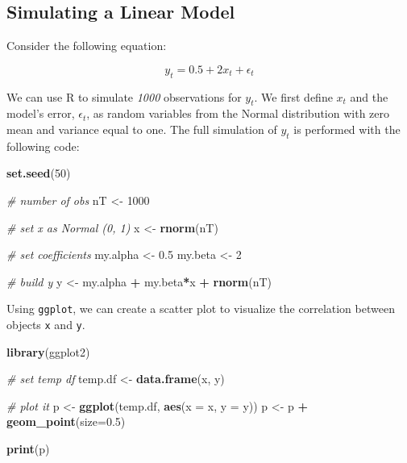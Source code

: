 \documentclass[11pt,]{book}
\newenvironment{Shaded}{\begin{snugshade}}{\end{snugshade}}
\newcommand{\KeywordTok}[1]{\textcolor[rgb]{0.27,0.27,0.27}{\textbf{#1}}}
\newcommand{\DataTypeTok}[1]{\textcolor[rgb]{0.27,0.27,0.27}{#1}}
\newcommand{\DecValTok}[1]{\textcolor[rgb]{0.06,0.06,0.06}{#1}}
\newcommand{\FloatTok}[1]{\textcolor[rgb]{0.06,0.06,0.06}{#1}}
\newcommand{\StringTok}[1]{\textcolor[rgb]{0.5,0.5,0.5}{#1}}
\newcommand{\CommentTok}[1]{\textcolor[rgb]{0.56,0.35,0.01}{\textit{#1}}}
\newcommand{\OperatorTok}[1]{\textcolor[rgb]{0.81,0.36,0.00}{\textbf{#1}}}
\newcommand{\NormalTok}[1]{#1}
\begin{document}
\subsection{Simulating a Linear Model}\label{simulating-a-linear-model}

Consider the following equation:

\[y _t = 0.5 + 2 x_{t} + \epsilon _t\]

We can use R to simulate \emph{1000} observations for \(y_t\). We first
define \(x_t\) and the model's error, \(\epsilon _t\), as random
variables from the Normal distribution with zero mean and variance equal
to one. The full simulation of \(y_t\) is performed with the following
code:

\begin{Shaded}
\begin{Highlighting}[]
\KeywordTok{set.seed}\NormalTok{(}\DecValTok{50}\NormalTok{)}

\CommentTok{# number of obs}
\NormalTok{nT <-}\StringTok{ }\DecValTok{1000} 

\CommentTok{# set x as Normal (0, 1)}
\NormalTok{x <-}\StringTok{ }\KeywordTok{rnorm}\NormalTok{(nT)}

\CommentTok{# set coefficients}
\NormalTok{my.alpha <-}\StringTok{ }\FloatTok{0.5}
\NormalTok{my.beta <-}\StringTok{ }\DecValTok{2}

\CommentTok{# build y}
\NormalTok{y <-}\StringTok{ }\NormalTok{my.alpha }\OperatorTok{+}\StringTok{ }\NormalTok{my.beta}\OperatorTok{*}\NormalTok{x }\OperatorTok{+}\StringTok{ }\KeywordTok{rnorm}\NormalTok{(nT)}
\end{Highlighting}
\end{Shaded}

Using \texttt{ggplot}, we can create a scatter plot to visualize the
correlation between objects \texttt{x} and \texttt{y}.

\begin{Shaded}
\begin{Highlighting}[]
\KeywordTok{library}\NormalTok{(ggplot2)}

\CommentTok{# set temp df}
\NormalTok{temp.df <-}\StringTok{ }\KeywordTok{data.frame}\NormalTok{(x, y)}

\CommentTok{# plot it}
\NormalTok{p <-}\StringTok{ }\KeywordTok{ggplot}\NormalTok{(temp.df, }\KeywordTok{aes}\NormalTok{(}\DataTypeTok{x =}\NormalTok{ x, }\DataTypeTok{y =}\NormalTok{ y))}
\NormalTok{p <-}\StringTok{ }\NormalTok{p }\OperatorTok{+}\StringTok{ }\KeywordTok{geom_point}\NormalTok{(}\DataTypeTok{size=}\FloatTok{0.5}\NormalTok{)}

\KeywordTok{print}\NormalTok{(p)}
\end{Highlighting}
\end{Shaded}
\end{document}
